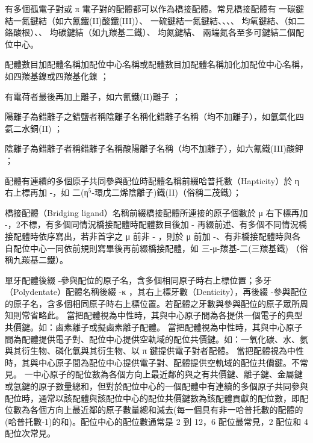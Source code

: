 \documentclass[a4paper,12pt]{report}
\begin{document}
有多個孤電子對或 π 電子對的配體都可以作為橋接配體。常見橋接配體有  一碳鍵結一氮鍵結（如六氰鐵(II)酸鐵(III)）、 一硫鍵結一氮鍵結、、、、 均氧鍵結、（如二鉻酸根）、、 均碳鍵結（如九羰基二鐵）、 均氮鍵結、 兩端氮各至多可鍵結二個配位中心。
\bit
\item 配體數目加配體名稱加配位中心名稱或配體數目加配體名稱加化加配位中心名稱，如四羰基鎳或四羰基化鎳 \ce{[Ni(CO)4]}；
\item 有電荷者最後再加上離子，如六氰鐵(II)離子 ；
\item 陽離子為錯離子之錯鹽者稱陰離子名稱化錯離子名稱（均不加離子），如氫氧化四氨二水銅(II) ；
\item 陰離子為錯離子者稱錯離子名稱酸陽離子名稱（均不加離子），如六氰鐵(III)酸鉀 ；
\item 配體有連續的多個原子共同參與配位時配體名稱前綴哈普托數（Hapticity）於 η 右上標再加 -，如 二(η$^5$-環戊二烯陰離子)鐵(II)（俗稱二茂鐵）；
\item 橋接配體（Bridging ligand）名稱前綴橋接配體所連接的原子個數於 μ 右下標再加 -，2不標，有多個同情況橋接配體時配體數目後加 - 再綴前述、有多個不同情況橋接配體時依序寫出，若非首字之 μ 前非 - ，則於 μ 前加 -、有非橋接配體時與各自配位中心一同依前規則寫畢後再前綴橋接配體，如 三-μ-羰基-二(三羰基鐵) （俗稱九羰基二鐵）。
\item 單牙配體後綴 -參與配位的原子名，含多個相同原子時右上標位置；多牙（Polydentate）配體名稱後綴 -κ ，其右上標牙數（Denticity），再後綴 -參與配位的原子名，含多個相同原子時右上標位置。若配體之牙數與參與配位的原子眾所周知則常省略此。
\eit
{}
當把配體視為中性時，其與中心原子間為各提供一個電子的典型共價鍵。如：鹵素離子或擬鹵素離子配體。
當把配體視為中性時，其與中心原子間為配體提供電子對、配位中心提供空軌域的配位共價鍵。如：一氧化碳、水、氨與其衍生物、磷化氫與其衍生物、以 π 鍵提供電子對者配體。
當把配體視為中性時，其與中心原子間為配位中心提供電子對、配體提供空軌域的配位共價鍵。不常見。
一中心原子的配位數為各個方向上最近鄰的與之有共價鍵、離子鍵、金屬鍵或氫鍵的原子數量總和，但對於配位中心的一個配體中有連續的多個原子共同參與配位時，通常以該配體與該配位中心的配位共價鍵數為該配體貢獻的配位數，即配位數為各個方向上最近鄰的原子數量總和減去(每一個具有非一哈普托數的配體的(哈普托數-1)的和)。配位中心的配位數通常是 2 到 12，6 配位最常見，2 配位和 4 配位次常見。
\end{document}
